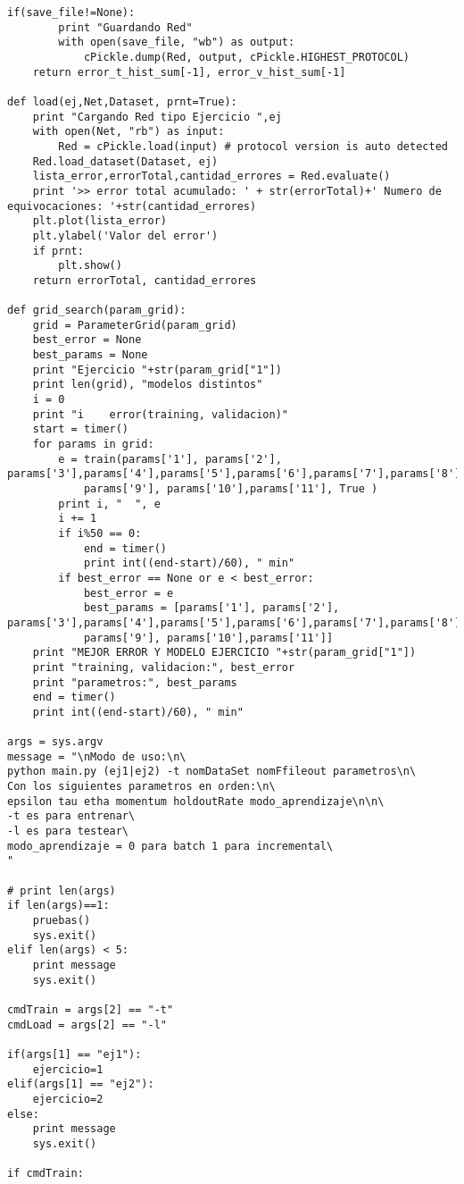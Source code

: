 \begin{lstlisting}[caption=main.py]
	if(save_file!=None):
		print "Guardando Red"
		with open(save_file, "wb") as output:
			cPickle.dump(Red, output, cPickle.HIGHEST_PROTOCOL)
	return error_t_hist_sum[-1], error_v_hist_sum[-1]

def load(ej,Net,Dataset, prnt=True):
	print "Cargando Red tipo Ejercicio ",ej
	with open(Net, "rb") as input:
		Red = cPickle.load(input) # protocol version is auto detected
	Red.load_dataset(Dataset, ej)
	lista_error,errorTotal,cantidad_errores = Red.evaluate()
	print '>> error total acumulado: ' + str(errorTotal)+' Numero de equivocaciones: '+str(cantidad_errores)	
	plt.plot(lista_error)
	plt.ylabel('Valor del error')
	if prnt:
		plt.show()
	return errorTotal, cantidad_errores	

def grid_search(param_grid):
	grid = ParameterGrid(param_grid)
	best_error = None
	best_params = None
	print "Ejercicio "+str(param_grid["1"])
	print len(grid), "modelos distintos"
	i = 0
	print "i 	error(training, validacion)"
	start = timer()
	for params in grid:
	    e = train(params['1'], params['2'], params['3'],params['4'],params['5'],params['6'],params['7'],params['8'],
	    	params['9'], params['10'],params['11'], True )
	    print i, "	", e
	    i += 1
	    if i%50 == 0:
	    	end = timer()
	    	print int((end-start)/60), " min"
	    if best_error == None or e < best_error:
	    	best_error = e
	    	best_params = [params['1'], params['2'], params['3'],params['4'],params['5'],params['6'],params['7'],params['8'],
	    	params['9'], params['10'],params['11']]
	print "MEJOR ERROR Y MODELO EJERCICIO "+str(param_grid["1"])
	print "training, validacion:", best_error
	print "parametros:", best_params
	end = timer()
	print int((end-start)/60), " min"
	
args = sys.argv
message = "\nModo de uso:\n\
python main.py (ej1|ej2) -t nomDataSet nomFfileout parametros\n\
Con los siguientes parametros en orden:\n\
epsilon tau etha momentum holdoutRate modo_aprendizaje\n\n\
-t es para entrenar\
-l es para testear\
modo_aprendizaje = 0 para batch 1 para incremental\
"

# print len(args)
if len(args)==1:
	pruebas()
	sys.exit()
elif len(args) < 5:
	print message
	sys.exit()

cmdTrain = args[2] == "-t"
cmdLoad = args[2] == "-l"

if(args[1] == "ej1"):
	ejercicio=1
elif(args[1] == "ej2"):
	ejercicio=2
else:
	print message
	sys.exit()

if cmdTrain:
	

\end{lstlisting}
